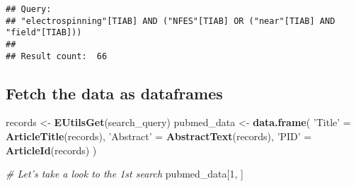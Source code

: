\documentclass[
  a4paper]{article}
\newenvironment{Shaded}{\begin{snugshade}}{\end{snugshade}}
\newcommand{\CommentTok}[1]{\textcolor[rgb]{0.56,0.35,0.01}{\textit{#1}}}
\newcommand{\DecValTok}[1]{\textcolor[rgb]{0.00,0.00,0.81}{#1}}
\newcommand{\KeywordTok}[1]{\textcolor[rgb]{0.13,0.29,0.53}{\textbf{#1}}}
\newcommand{\NormalTok}[1]{#1}
\newcommand{\StringTok}[1]{\textcolor[rgb]{0.31,0.60,0.02}{#1}}
\begin{document}
\begin{verbatim}
## Query:
## "electrospinning"[TIAB] AND ("NFES"[TIAB] OR ("near"[TIAB] AND "field"[TIAB])) 
## 
## Result count:  66
\end{verbatim}

\hypertarget{fetch-the-data-as-dataframes}{%
\subsection{Fetch the data as
dataframes}\label{fetch-the-data-as-dataframes}}

\begin{Shaded}
\begin{Highlighting}[]
\NormalTok{records <-}\StringTok{ }\KeywordTok{EUtilsGet}\NormalTok{(search_query)}
\NormalTok{pubmed_data <-}
\StringTok{    }\KeywordTok{data.frame}\NormalTok{(}
        \StringTok{'Title'}\NormalTok{ =}\StringTok{ }\KeywordTok{ArticleTitle}\NormalTok{(records),}
        \StringTok{'Abstract'}\NormalTok{ =}\StringTok{ }\KeywordTok{AbstractText}\NormalTok{(records),}
        \StringTok{'PID'}\NormalTok{ =}\StringTok{ }\KeywordTok{ArticleId}\NormalTok{(records)}
\NormalTok{    )}

\CommentTok{# Let's take a look to the 1st search}
\NormalTok{pubmed_data[}\DecValTok{1}\NormalTok{, ]}
\end{Highlighting}
\end{Shaded}
\end{document}
